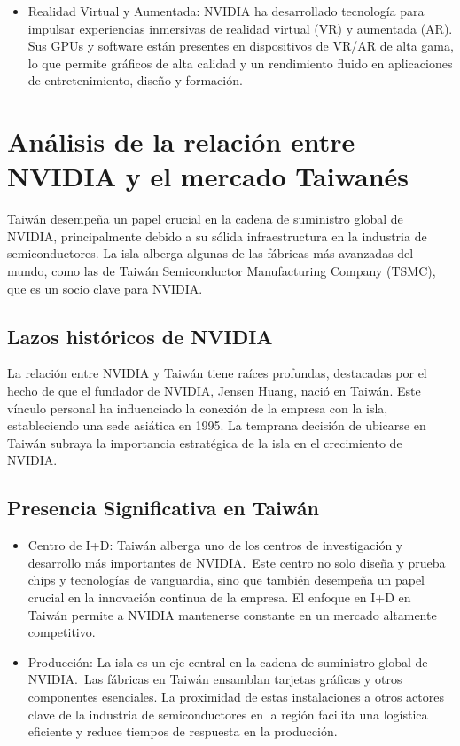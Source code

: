 \documentclass[twocolumn, 12pt]{article}
\begin{document}
\begin{itemize}
      \item Realidad Virtual y Aumentada:
            NVIDIA ha desarrollado tecnología para impulsar experiencias
            inmersivas de realidad virtual (VR) y aumentada (AR). Sus GPUs
            y software están presentes en dispositivos de VR/AR de alta gama,
            lo que permite gráficos de alta calidad y un rendimiento fluido
            en aplicaciones de entretenimiento, diseño y formación.

\end{itemize}

\section{Análisis de la relación entre NVIDIA y el mercado Taiwanés}

Taiwán desempeña un papel crucial en la cadena de suministro
global de NVIDIA, principalmente debido a su sólida
infraestructura en la industria de semiconductores. La isla
alberga algunas de las fábricas más avanzadas del mundo, como
las de Taiwán Semiconductor Manufacturing Company (TSMC), que
es un socio clave para NVIDIA.\@{}

\subsection*{Lazos históricos de NVIDIA}

La relación entre NVIDIA y Taiwán tiene raíces profundas, destacadas
por el hecho de que el fundador de NVIDIA, Jensen Huang, nació en
Taiwán. Este vínculo personal ha influenciado la conexión de la
empresa con la isla, estableciendo una sede asiática en 1995. La
temprana decisión de ubicarse en Taiwán subraya la importancia
estratégica de la isla en el crecimiento de NVIDIA.\@{}

\subsection*{Presencia Significativa en Taiwán}

\begin{itemize}
      \item Centro de I+D:\@{}
            Taiwán alberga uno de los centros de investigación y
            desarrollo más importantes de NVIDIA.~Este centro no solo
            diseña y prueba chips y tecnologías de vanguardia, sino que
            también desempeña un papel crucial en la innovación continua
            de la empresa. El enfoque en I+D en Taiwán permite a NVIDIA
            mantenerse constante en un mercado altamente competitivo.

      \item Producción:
            La isla es un eje central en la cadena de suministro global
            de NVIDIA.~Las fábricas en Taiwán ensamblan tarjetas gráficas
            y otros componentes esenciales. La proximidad de estas
            instalaciones a otros actores clave de la industria de
            semiconductores en la región facilita una logística eficiente
            y reduce tiempos de respuesta en la producción.

\end{itemize}
\end{document}
